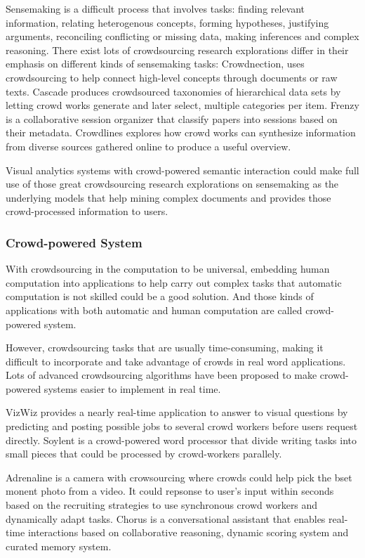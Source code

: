 \documentclass[journal]{vgtc}                %
\begin{document}
Sensemaking\cite{Pirolli2005} is a difficult process that involves tasks: finding relevant information, relating heterogenous concepts, forming hypotheses, justifying arguments, reconciling conflicting or missing data, making inferences and complex reasoning\cite{Thomas2005}. There exist lots of crowdsourcing research explorations differ in their emphasis on different kinds of sensemaking tasks:  Crowdnection\cite{Wang:2016cb}, uses crowdsourcing to help connect high-level concepts through documents or raw texts. Cascade\cite{Chilton2013} produces crowdsourced taxonomies of hierarchical data sets by letting crowd works generate and later select, multiple categories per item. Frenzy\cite{Chilton2014} is a collaborative session organizer that classify papers into sessions based on their metadata. Crowdlines\cite{Luther2015} explores how crowd works can synthesize information from diverse sources gathered online to produce a useful overview.

Visual analytics systems with crowd-powered semantic interaction could make full use of those great crowdsourcing research explorations on sensemaking as the underlying models that help mining complex documents and provides those crowd-processed information to users.

\subsubsection{Crowd-powered System}
With crowdsourcing in the computation to be universal, embedding human computation into applications to help carry out complex tasks that automatic computation is not skilled could be a good solution. And those kinds of applications with both automatic and human computation are called crowd-powered system.

However, crowdsourcing tasks that are usually time-consuming, making it difficult to incorporate and take advantage of crowds in real word applications. Lots of advanced crowdsourcing algorithms have been proposed to make crowd-powered systems easier to implement in real time.

VizWiz\cite{Bigham2010} provides a nearly real-time application to answer to visual questions by predicting and posting possible jobs to several crowd workers before users request directly. Soylent\cite{Bernstein2010} is a crowd-powered word processor that divide writing tasks into small pieces that could be processed by crowd-workers parallely.

Adrenaline \cite{Bernstein2011} is a camera with crowsourcing where crowds could help pick the bset monent photo from a video. It could repsonse to user's input within seconds based on the recruiting strategies to use synchronous crowd workers and dynamically adapt tasks. Chorus\cite{Lasecki2013} is a conversational assistant that enables real-time interactions based on collaborative reasoning, dynamic scoring system and curated memory system.
\end{document}
